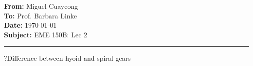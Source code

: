 \documentclass[11pt]{article}
\newcommand{\memoheader}[4]{
  \noindent
  \textbf{From:} #2\\ 
  \textbf{To:} #1\\
  \textbf{Date:} #3\\
  \textbf{Subject:} #4\\[1ex]\hrule\vspace{1.5ex}
}
\begin{document}
\memoheader{Prof. Barbara Linke}
            {Miguel Cuaycong}
            {\today}
            {EME 150B: Lec 2}
\noindent ?Difference between hyoid and spiral gears
\end{document}
